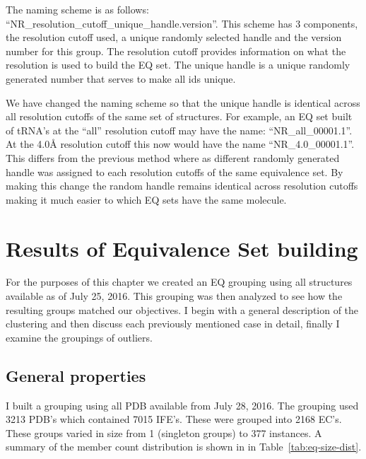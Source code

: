 The naming scheme is as follows:
``NR\_{resolution\_cutoff}\_{unique\_handle}.{version}''. This scheme has 3
components, the resolution cutoff used, a unique randomly selected handle and
the version number for this group. The resolution cutoff provides information on
what the resolution is used to build the EQ set. The unique handle is a unique
randomly generated number that serves to make all ids unique.

We have changed the naming scheme so that the unique handle is identical across
all resolution cutoffs of the same set of structures. For example, an EQ set
built of tRNA’s at the ``all'' resolution cutoff may have the name:
``NR\_all\_00001.1''. At the 4.0{\AA} resolution cutoff this now would have the
name ``NR\_4.0\_00001.1''. This differs from the previous method where as
different randomly generated handle was assigned to each resolution cutoffs of
the same equivalence set. By making this change the random handle remains
identical across resolution cutoffs making it much easier to which EQ sets have
the same molecule.

\section{Results of Equivalence Set building}

For the purposes of this chapter we created an EQ grouping using all structures
available as of July 25, 2016. This grouping was then analyzed to see how the
resulting groups matched our objectives. I begin with a general description of
the clustering and then discuss each previously mentioned case in detail,
finally I examine the groupings of outliers.

\subsection{General properties}

I built a grouping using all PDB available from July 28, 2016. The grouping used
3213 PDB’s which contained 7015 IFE’s. These were grouped into 2168 EC’s. These
groups varied in size from 1 (singleton groups) to 377 instances. A summary of
the member count distribution is shown in in Table~\ref{tab:eq-size-dist}.

